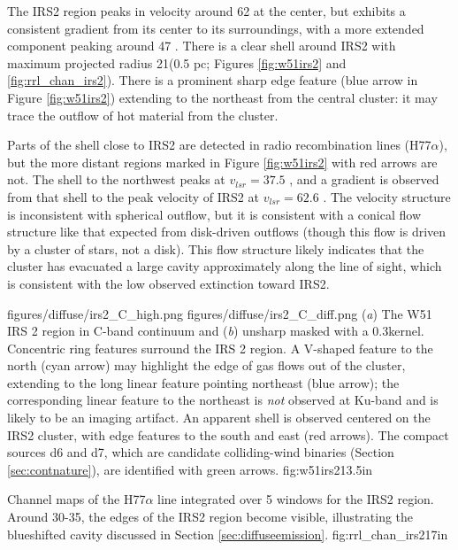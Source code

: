 The IRS2 region peaks in velocity around 62 \kms at the center, but exhibits a
consistent gradient from its center to its surroundings, with a more extended
component peaking around 47 \kms.  There is a clear shell around IRS2
with maximum projected radius 21\arcsec (0.5 pc; Figures \ref{fig:w51irs2} and
\ref{fig:rrl_chan_irs2}).  There is a prominent sharp edge feature (blue arrow
in Figure \ref{fig:w51irs2}) extending to the northeast from the central
cluster: it may trace the outflow of hot material from the cluster.

Parts of the shell close to IRS2 are detected in radio recombination lines
(H77$\alpha$), but the more distant regions marked in Figure \ref{fig:w51irs2}
with red arrows are not.  The shell to the northwest peaks at $v_{lsr}=37.5$
\kms, and a gradient is observed from that shell to the peak velocity of IRS2
at $v_{lsr} = 62.6$ \kms.  The velocity structure is inconsistent with
spherical outflow, but it is consistent with a conical flow structure like that
expected from disk-driven outflows (though this flow is driven by a cluster of
stars, not a disk).  This flow structure likely indicates that
the cluster has evacuated a large cavity approximately along the line of sight,
which is consistent with the low observed extinction toward IRS2.  

\FigureTwo
{figures/diffuse/irs2_C_high.png}
{figures/diffuse/irs2_C_diff.png}
{(\textit{a}) The W51 IRS 2 region in C-band continuum and (\textit{b}) unsharp
masked with a 0.3\arcsec kernel.  Concentric ring features surround the IRS 2
region.  A V-shaped feature to the north (cyan arrow) may highlight the edge of
gas flows out of the cluster, extending to the long linear feature pointing
northeast (blue arrow); the corresponding linear feature to the northeast is
\emph{not} observed at Ku-band and is likely to be an imaging artifact.  An
apparent shell is observed centered on the IRS2 cluster, with edge
features to the south and east (red arrows).  The compact sources d6 and d7,
which are candidate colliding-wind binaries (Section \ref{sec:contnature}),
are identified with green arrows.
}
{fig:w51irs2}{1}{3.5in}

{Channel maps of the H77$\alpha$ line integrated over 5 \kms windows
for the IRS2 region.  Around 30-35\kms, the edges of the IRS2 region become
visible, illustrating the blueshifted cavity discussed in Section
\ref{sec:diffuseemission}.}
{fig:rrl_chan_irs2}{1}{7in}


